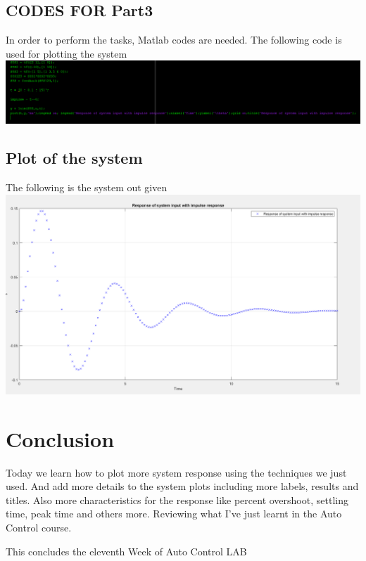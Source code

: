 \documentclass[12pt]{article}
\begin{document}
\subsection{CODES FOR Part3}
In order to perform the tasks, Matlab codes are needed. The following code is used for plotting the system \\

\includegraphics[scale=0.5]{../Lab9/Pictures/code3.png} \\


\subsection{Plot of the system} 
The following is the system out given\\

\includegraphics[scale=0.4]{../Lab9/Pictures/output3.png}  \\




\section{Conclusion}
Today we learn how to plot more system response using the techniques we just used. And add more details to the system plots including more labels, results and titles. Also more characteristics for the response like percent overshoot, settling time, peak time and others more. Reviewing what I've just learnt in the Auto Control course.

\begin{center} 
This concludes the eleventh Week of Auto Control LAB\\
\end{center}
\end{document}
